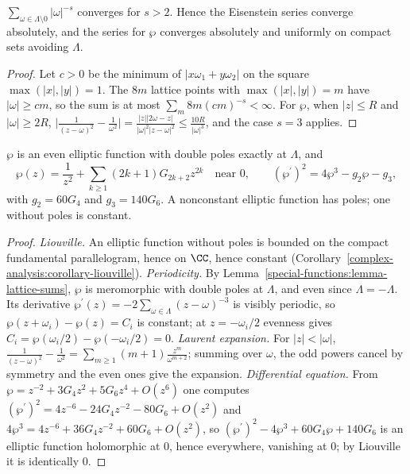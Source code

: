 \begin{lemma}\label{special-functions:lemma-lattice-sums}
$\sum_{\omega \in \Lambda \setminus 0}|\omega|^{-s}$ converges for $s > 2$. Hence the Eisenstein series converge absolutely, and the series for $\wp$ converges absolutely and uniformly on compact sets avoiding $\Lambda$.
\end{lemma}

\begin{proof}
Let $c > 0$ be the minimum of $|x\omega_1 + y\omega_2|$ on the square $\max(|x|, |y|) = 1$. The $8m$ lattice points with $\max(|x|, |y|) = m$ have $|\omega| \geq cm$, so the sum is at most $\sum_m8m(cm)^{-s} < \infty$. For $\wp$, when
$|z| \leq R$ and $|\omega| \geq 2R$, $\bigl|\frac{1}{(z - \omega)^2} - \frac{1}{\omega^2}\bigr| = \frac{|z||2\omega - z|}{|\omega|^2|z - \omega|^2} \leq \frac{10R}{|\omega|^3}$, and the case $s = 3$ applies.
\end{proof}

\begin{theorem}\label{special-functions:theorem-weierstrass-p}
$\wp$ is an even elliptic function with double poles exactly at $\Lambda$, and
\[
\wp(z) = \frac{1}{z^2} + \sum_{k \geq 1}(2k + 1)G_{2k+2}z^{2k} \quad \text{near } 0, \qquad (\wp^{\prime})^2 = 4\wp^3 - g_2\wp - g_3,
\]
with $g_2 = 60G_4$ and $g_3 = 140G_6$. A nonconstant elliptic function has poles; one without poles is constant.
\end{theorem}

\begin{proof}
\emph{Liouville.} An elliptic function without poles is bounded on the compact fundamental parallelogram, hence on $\CC$, hence constant (Corollary~\ref{complex-analysis:corollary-liouville}).
\emph{Periodicity.} By Lemma~\ref{special-functions:lemma-lattice-sums}, $\wp$ is meromorphic with double poles at $\Lambda$, and even since $\Lambda = -\Lambda$. Its derivative $\wp^{\prime}(z) = -2\sum_{\omega \in \Lambda}(z - \omega)^{-3}$ is
visibly periodic, so $\wp(z + \omega_i) - \wp(z) = C_i$ is constant; at $z = -\omega_i/2$ evenness gives $C_i = \wp(\omega_i/2) - \wp(-\omega_i/2) = 0$.
\emph{Laurent expansion.} For $|z| < |\omega|$, $\frac{1}{(z - \omega)^2} - \frac{1}{\omega^2} = \sum_{m \geq 1}(m + 1)\frac{z^m}{\omega^{m+2}}$; summing over $\omega$, the odd powers cancel by symmetry and the even ones give the
expansion.
\emph{Differential equation.} From $\wp = z^{-2} + 3G_4z^2 + 5G_6z^4 + O(z^6)$ one computes $(\wp^{\prime})^2 = 4z^{-6} - 24G_4z^{-2} - 80G_6 + O(z^2)$ and $4\wp^3 = 4z^{-6} + 36G_4z^{-2} + 60G_6 + O(z^2)$, so
$(\wp^{\prime})^2 - 4\wp^3 + 60G_4\wp + 140G_6$ is an elliptic function holomorphic at $0$, hence everywhere, vanishing at $0$; by Liouville it is identically $0$.
\end{proof}

